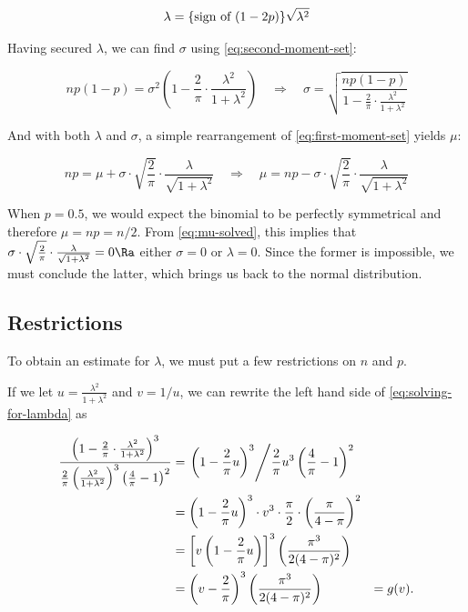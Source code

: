 \documentclass{article}
\begin{document}
\begin{equation}
  \label{eq:lambda-solved}
  \lambda = \textnormal{\{sign of $(1-2p)$\}} \sqrt{\lambda^2}
\end{equation}

Having secured $\lambda$, we can find $\sigma$ using
\eqref{eq:second-moment-set}:

\begin{equation}
  \label{eq:sigma-solved}
  np(1-p) = \sigma^2 \left( 1 - \frac{2}{\pi} \cdot \frac{\lambda^2}{1 + \lambda^2} \right) \quad\Rightarrow\quad
  \sigma = \sqrt{\frac{np(1-p)}{1 - \frac{2}{\pi} \cdot \frac{\lambda^2}{1 + \lambda^2}}}
\end{equation}

And with both $\lambda$ and $\sigma$, a simple rearrangement of
\eqref{eq:first-moment-set} yields $\mu$:

\begin{equation}
  \label{eq:mu-solved}
  np = \mu + \sigma \cdot \sqrt{\frac{2}{\pi}} \cdot \frac{\lambda}{\sqrt{1 + \lambda^2}} \quad\Rightarrow\quad
  \mu = np - \sigma \cdot \sqrt{\frac{2}{\pi}} \cdot \frac{\lambda}{\sqrt{1 + \lambda^2}}
\end{equation}

When $p = 0.5$, we would expect the binomial to be perfectly symmetrical and
therefore $\mu = np = n/2$. From \eqref{eq:mu-solved}, this implies that
$\sigma \cdot \sqrt{\frac{2}{\pi}} \cdot \frac{\lambda}{\sqrt{1 + \lambda^2}} =
0 \Ra$ either $\sigma = 0$ or $\lambda = 0$. Since the former is impossible, we
must conclude the latter, which brings us back to the normal distribution.

\subsection{Restrictions}

To obtain an estimate for $\lambda$, we must put a few restrictions on $n$ and
$p$.

If we let $u = \frac{\lambda^2}{1+\lambda^2}$ and $v = 1/u$, we can rewrite the
left hand side of \eqref{eq:solving-for-lambda} as

\begin{alignat*}{3}
  \frac{\left( 1 - \frac{2}{\pi} \cdot \frac{\lambda^2}{1+\lambda^2} \right)^3}{\frac{2}{\pi} \left( \frac{\lambda^2}{1+\lambda^2} \right)^3 \left( \frac{4}{\pi} - 1 \right)^2}
    &= \left. \left( 1 - \frac{2}{\pi} u \right)^3 \middle/ \frac{2}{\pi} u^3 \left( \frac{4}{\pi} - 1 \right)^2 \right. & \\
  &= \left( 1 - \frac{2}{\pi} u \right)^3 \cdot v^3 \cdot \frac{\pi}{2} \cdot \left( \frac{\pi}{4-\pi} \right)^2 & \\
  &= \left[ v \left( 1 - \frac{2}{\pi} u \right) \right]^3 \left( \frac{\pi^3}{2(4-\pi)^2} \right) & \\
  &= \left( v - \frac{2}{\pi} \right)^3 \left( \frac{\pi^3}{2(4-\pi)^2} \right) &= g(v).
\end{alignat*}
\end{document}
